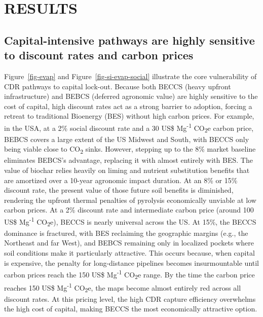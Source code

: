 \documentclass[
  letterpaper,
]{article}
\begin{document}
\section{RESULTS}\label{results}

\subsection{Capital-intensive pathways are highly sensitive to discount
rates and carbon
prices}\label{capital-intensive-pathways-are-highly-sensitive-to-discount-rates-and-carbon-prices}

Figure~\ref{fig-evap} and Figure~\ref{fig-si-evap-social} illustrate the
core vulnerability of CDR pathways to capital lock-out. Because both
BECCS (heavy upfront infrastructure) and BEBCS (deferred agronomic
value) are highly sensitive to the cost of capital, high discount rates
act as a strong barrier to adoption, forcing a retreat to traditional
Bioenergy (BES) without high carbon prices. For example, in the USA, at
a 2\% social discount rate and a 30 US\$ Mg\textsuperscript{-1}
CO\textsubscript{2}e carbon price, BEBCS covers a large extent of the US
Midwest and South, with BECCS only being viable close to
CO\textsubscript{2} sinks. However, stepping up to the 8\% market
baseline eliminates BEBCS's advantage, replacing it with almost entirely
with BES. The value of biochar relies heavily on liming and nutrient
substitution benefits that are amortized over a 10-year agronomic impact
duration. At an 8\% or 15\% discount rate, the present value of those
future soil benefits is diminished, rendering the upfront thermal
penalties of pyrolysis economically unviable at low carbon prices. At a
2\% discount rate and intermediate carbon price (around 100 US\$
Mg\textsuperscript{-1} CO\textsubscript{2}e), BECCS is nearly universal
across the US. At 15\%, the BECCS dominance is fractured, with BES
reclaiming the geographic margins (e.g., the Northeast and far West),
and BEBCS remaining only in localized pockets where soil conditions make
it particularly attractive. This occurs because, when capital is
expensive, the penalty for long-distance pipelines becomes
insurmountable until carbon prices reach the 150 US\$
Mg\textsuperscript{-1} CO\textsubscript{2}e range. By the time the
carbon price reaches 150 US\$ Mg\textsuperscript{-1}
CO\textsubscript{2}e, the maps become almost entirely red across all
discount rates. At this pricing level, the high CDR capture efficiency
overwhelms the high cost of capital, making BECCS the most economically
attractive option.
\end{document}

